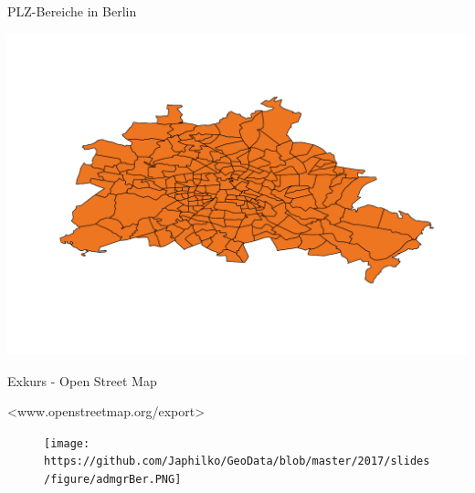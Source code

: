 \begin{frame}[fragile]{PLZ-Bereiche in Berlin}

\begin{Shaded}
\end{Shaded}

\includegraphics{ps_user_stuttgart_part3_files/figure-beamer/unnamed-chunk-23-1.pdf}

\end{frame}

\begin{frame}{Exkurs - Open Street Map}

\textless{}www.openstreetmap.org/export\textgreater{}

\begin{figure}
\centering
\texttt{[image: https://github.com/Japhilko/GeoData/blob/master/2017/slides/figure/admgrBer.PNG]}
\caption{}
\end{figure}

\end{frame}

